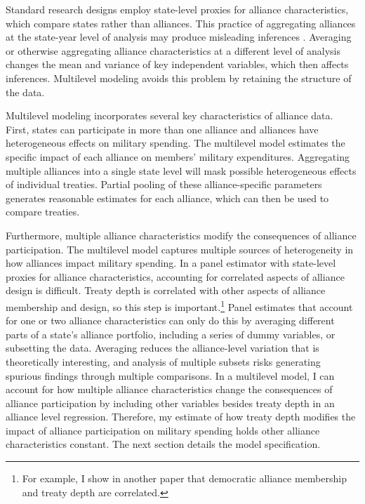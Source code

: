 \documentclass[12pt]{article}
\begin{document}
Standard research designs employ state-level proxies for alliance characteristics, which compare states rather than alliances.
This practice of aggregating alliances at the state-year level of analysis may produce misleading inferences \citep[pg. 356]{McElreath2016}.
Averaging or otherwise aggregating alliance characteristics at a different level of analysis changes the mean and variance of key independent variables, which then affects inferences. 
Multilevel modeling avoids this problem by retaining the structure of the data. 


Multilevel modeling incorporates several key characteristics of alliance data. 
First, states can participate in more than one alliance and alliances have heterogeneous effects on military spending.
The multilevel model estimates the specific impact of each alliance on members' military expenditures. 
Aggregating multiple alliances into a single state level will mask possible heterogeneous effects of individual treaties. 
Partial pooling of these alliance-specific parameters generates reasonable estimates for each alliance, which can then be used to compare treaties. 


Furthermore, multiple alliance characteristics modify the consequences of alliance participation.
The multilevel model captures multiple sources of heterogeneity in how alliances impact military spending. 
In a panel estimator with state-level proxies for alliance characteristics, accounting for correlated aspects of alliance design is difficult. 
Treaty depth is correlated with other aspects of alliance membership and design, so this step is important.\footnote{For example, I show in another paper that democratic alliance membership and treaty depth are correlated.}
Panel estimates that account for one or two alliance characteristics can only do this by averaging different parts of a state's alliance portfolio, including a series of dummy variables, or subsetting the data.
Averaging reduces the alliance-level variation that is theoretically interesting, and analysis of multiple subsets risks generating spurious findings through multiple comparisons.  
In a multilevel model, I can account for how multiple alliance characteristics change the consequences of alliance participation by including other variables besides treaty depth in an alliance level regression. 
Therefore, my estimate of how treaty depth modifies the impact of alliance participation on military spending holds other alliance characteristics constant. 
The next section details the model specification. 
 
\end{document}
